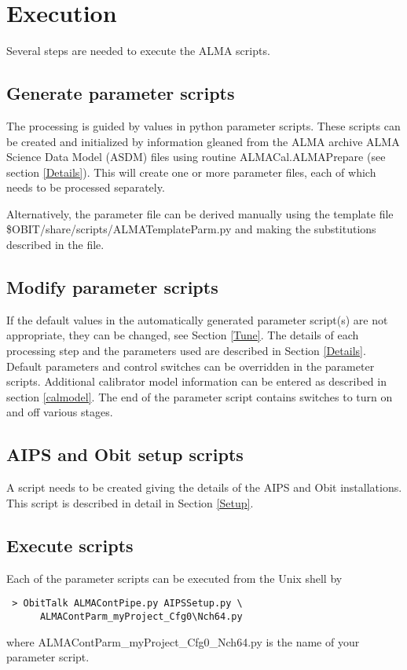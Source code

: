 \documentclass[11pt]{article}
\begin{document}
\section{Execution}
Several steps are needed to execute the ALMA scripts.
\subsection{Generate parameter scripts}
The processing is guided by values in python parameter scripts.
These scripts can be created and initialized by information gleaned from
the ALMA archive ALMA Science Data Model (ASDM) files using routine
ALMACal.ALMAPrepare (see section \ref{Details}).
This will create one or more parameter files, each of which needs to
be processed separately.

Alternatively, the parameter file can be derived manually using the
template file \$OBIT/share/scripts/ALMATemplateParm.py and making
the substitutions described in the file.

\subsection{Modify parameter scripts}
If the default values in the automatically generated parameter
script(s) are not appropriate, they can be changed, see Section
\ref{Tune}. 
The details of each processing step and the parameters used are
described in Section \ref{Details}.
Default parameters and control switches can be overridden in the
parameter scripts.
Additional calibrator model information can be entered as described in
section \ref{calmodel}.
The end of the parameter script contains switches to turn on and off
various stages.

\subsection{AIPS and Obit setup scripts}
A script needs to be created giving the details of the AIPS and Obit
installations. 
This script is described in detail in Section \ref{Setup}.

\subsection{Execute scripts}
Each of the parameter scripts can be executed from the Unix shell by
\begin{verbatim}
 > ObitTalk ALMAContPipe.py AIPSSetup.py \
      ALMAContParm_myProject_Cfg0\Nch64.py
\end{verbatim}
where ALMAContParm\_myProject\_Cfg0\_Nch64.py is the name of your
parameter script.
\end{document}
